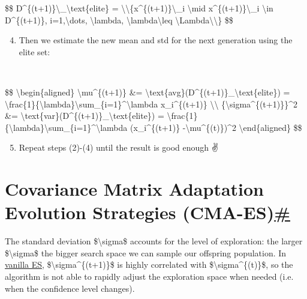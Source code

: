 \$\$ D\^{}\{(t+1)\}\textbackslash\_\textbackslash text\{elite\} = \textbackslash\textbackslash\{x\^{}\{(t+1)\}\textbackslash\_i \textbackslash mid x\^{}\{(t+1)\}\textbackslash\_i \textbackslash in D\^{}\{(t+1)\}, i=1,\textbackslash dots, \textbackslash lambda, \textbackslash lambda\textbackslash leq \textbackslash Lambda\textbackslash\textbackslash\} \$\$

\begin{enumerate}
\setcounter{enumi}{3}
\tightlist
\item
  Then we estimate the new mean and std for the next generation using the elite set:\\
  \strut \\
\end{enumerate}

\$\$ \textbackslash begin\{aligned\} \textbackslash mu\^{}\{(t+1)\} \&= \textbackslash text\{avg\}(D\^{}\{(t+1)\}\_\textbackslash text\{elite\}) = \textbackslash frac\{1\}\{\textbackslash lambda\}\textbackslash sum\_\{i=1\}\^{}\textbackslash lambda x\_i\^{}\{(t+1)\} \textbackslash\textbackslash{} \{\textbackslash sigma\^{}\{(t+1)\}\}\^{}2 \&= \textbackslash text\{var\}(D\^{}\{(t+1)\}\_\textbackslash text\{elite\}) = \textbackslash frac\{1\}\{\textbackslash lambda\}\textbackslash sum\_\{i=1\}\^{}\textbackslash lambda (x\_i\^{}\{(t+1)\} -\textbackslash mu\^{}\{(t)\})\^{}2 \textbackslash end\{aligned\} \$\$

\begin{enumerate}
\setcounter{enumi}{4}
\tightlist
\item
  Repeat steps (2)-(4) until the result is good enough ✌️
\end{enumerate}

\section{\texorpdfstring{Covariance Matrix Adaptation Evolution Strategies (CMA-ES)\hyperref[covariance-matrix-adaptation-evolution-strategies-cma-es]{\#}}{Covariance Matrix Adaptation Evolution Strategies (CMA-ES)\#}}\label{covariance-matrix-adaptation-evolution-strategies-cma-es}

The standard deviation \$\textbackslash sigma\$ accounts for the level of exploration: the larger \$\textbackslash sigma\$ the bigger search space we can sample our offspring population. In \hyperref[simple-gaussian-evolution-strategies]{vanilla ES}, \$\textbackslash sigma\^{}\{(t+1)\}\$ is highly correlated with \$\textbackslash sigma\^{}\{(t)\}\$, so the algorithm is not able to rapidly adjust the exploration space when needed (i.e. when the confidence level changes).

